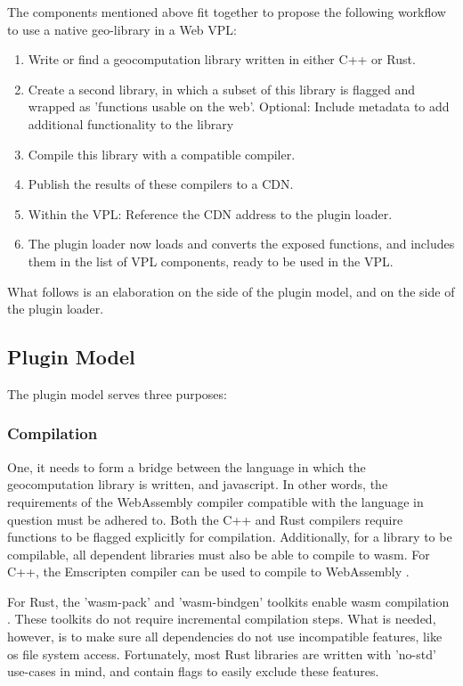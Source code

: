 The components mentioned above fit together to propose the following workflow to use a native geo-library in a Web VPL: 
\begin{enumerate}
  \item Write or find a geocomputation library written in either C++ or Rust. 
  \item Create a second library, in which a subset of this 
     library is flagged and wrapped as 'functions usable on the web'.
  \subitem Optional: Include metadata to add additional functionality to the library
  \item Compile this library with a compatible compiler.
  \item Publish the results of these compilers to a \ac{CDN}. 
  
  \item Within the VPL: Reference the CDN address to the plugin loader. 
  \item The plugin loader now loads and converts the exposed functions, and includes them in the list of VPL components, ready to be used in the VPL. 
\end{enumerate}
What follows is an elaboration on the side of the plugin model, and on the side of the plugin loader.

\subsection{Plugin Model}

The plugin model serves three purposes:

\subsubsection{Compilation}

One, it needs to form a bridge between the language in which the geocomputation library is written, and javascript. 
In other words, the requirements of the WebAssembly compiler compatible with the language in question must be adhered to. 
Both the C++ and Rust compilers require functions to be flagged explicitly for compilation. 
Additionally, for a library to be compilable, all dependent libraries must also be able to compile to wasm.
For C++, the Emscripten compiler can be used to compile to WebAssembly \citep*{emscripten_organization_emscripten_2022}. 

For Rust, the 'wasm-pack' and 'wasm-bindgen' toolkits enable \ac{wasm} compilation \citep{contributors_wasm-bindgen_2022,contributors_wasm-pack_2022}.
These toolkits do not require incremental compilation steps.
What is needed, however, is to make sure all dependencies do not use incompatible features, like os file system access. 
Fortunately, most Rust libraries are written with 'no-std' use-cases in mind, and contain flags to easily exclude these features. 


